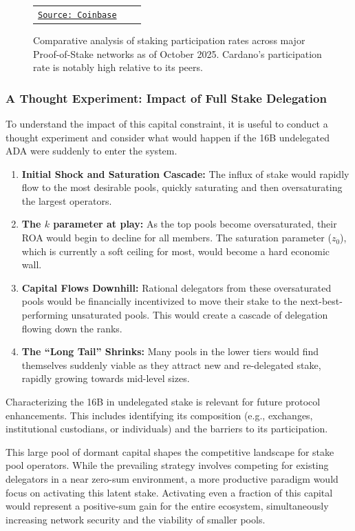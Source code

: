 \documentclass[11pt, letterpaper]{article}
\begin{document}
\begin{figure}[H]
\begin{tabular}{ccc}
\begin{minipage}{0.3\textwidth}
			\caption*{Avalanche}
			\href{https://www.coinbase.com/earn/staking/avalanche}{\texttt{\scriptsize Source: Coinbase}}
		\end{minipage}
	\end{tabular}
	\caption{Comparative analysis of staking participation rates across major Proof-of-Stake networks as of October 2025. Cardano's participation rate is notably high relative to its peers.}
	\label{fig:pos_comparison}
\end{figure}

\subsubsection*{A Thought Experiment: Impact of Full Stake Delegation}

To understand the impact of this capital constraint, it is useful to
conduct a thought experiment and consider what would happen if the 16B
undelegated ADA were suddenly to enter the system.

\begin{enumerate}
	\item \textbf{Initial Shock and Saturation Cascade:} The influx of stake would rapidly flow to the most desirable pools,
	      quickly saturating and then oversaturating the largest operators.
	\item \textbf{The $k$ parameter at play:} As the top pools become oversaturated, their ROA would begin to decline
	      for all members. The saturation parameter ($z_0$), which is currently a soft ceiling for most, would become a hard economic wall.
	\item \textbf{Capital Flows Downhill:} Rational delegators from these oversaturated pools would be financially incentivized to
	      move their stake to the next-best-performing unsaturated pools. This would create a cascade of delegation flowing down the ranks.
	\item \textbf{The ``Long Tail'' Shrinks:} Many pools in the lower tiers would find themselves suddenly viable as they attract
	      new and re-delegated stake, rapidly growing towards mid-level sizes.
\end{enumerate}

Characterizing the 16B in undelegated stake is relevant for future protocol enhancements. This
includes identifying its composition (e.g., exchanges, institutional custodians, or individuals) and
the barriers to its participation.

This large pool of dormant capital shapes the competitive landscape for stake
pool operators. While the prevailing strategy involves competing for existing
delegators in a near zero-sum environment, a more productive paradigm would
focus on activating this latent stake. Activating even a fraction of this
capital would represent a positive-sum gain for the entire ecosystem,
simultaneously increasing network security and the viability of smaller pools.
\end{document}
